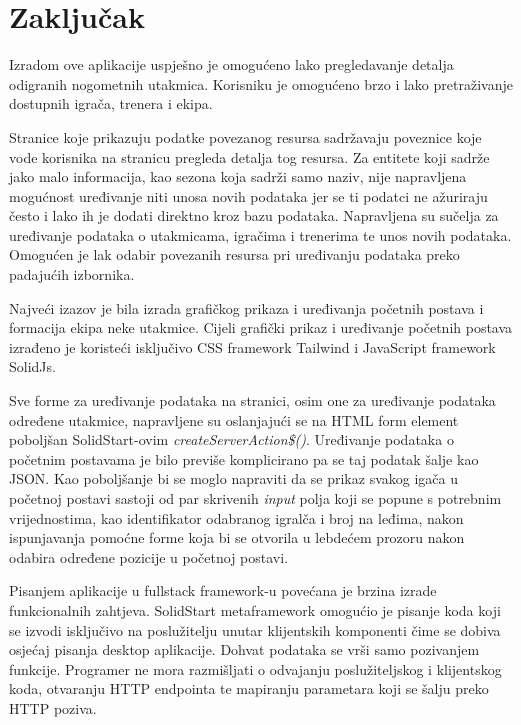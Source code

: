 \documentclass[times, utf8, zavrsni]{fer}
\begin{document}
\chapter{Zaključak}

Izradom ove aplikacije uspješno je omogućeno lako pregledavanje detalja odigranih nogometnih utakmica.
Korisniku je omogućeno brzo i lako pretraživanje dostupnih igrača, trenera i ekipa.

Stranice koje prikazuju podatke povezanog resursa sadržavaju poveznice koje vode korisnika na stranicu pregleda detalja tog resursa.
Za entitete koji sadrže jako malo informacija, kao sezona koja sadrži samo naziv, nije napravljena mogućnost uređivanje niti unosa novih podataka jer se ti podatci ne ažuriraju često i lako ih je dodati direktno kroz bazu podataka.
Napravljena su sučelja za uređivanje podataka o utakmicama, igračima i trenerima te unos novih podataka.
Omogućen je lak odabir povezanih resursa pri uređivanju podataka preko padajućih izbornika.

Najveći izazov je bila izrada grafičkog prikaza i uređivanja početnih postava i formacija ekipa neke utakmice.
Cijeli grafički prikaz i uređivanje početnih postava izrađeno je koristeći isključivo CSS framework Tailwind i JavaScript framework SolidJs.

Sve forme za uređivanje podataka na stranici, osim one za uređivanje podataka određene utakmice, napravljene su oslanjajući se na HTML form element poboljšan SolidStart-ovim \emph{createServerAction\$()}.
Uređivanje podataka o početnim postavama je bilo previše komplicirano pa se taj podatak šalje kao JSON.
Kao poboljšanje bi se moglo napraviti da se prikaz svakog igača u početnoj postavi sastoji od par skrivenih \emph{input} polja koji se popune s potrebnim vrijednostima, kao identifikator odabranog igralča i broj na leđima,
nakon ispunjavanja pomoćne forme koja bi se otvorila u lebdećem prozoru nakon odabira određene pozicije u početnoj postavi.

Pisanjem aplikacije u fullstack framework-u povećana je brzina izrade funkcionalnih zahtjeva.
SolidStart metaframework omogućio je pisanje koda koji se izvodi isključivo na poslužitelju unutar klijentskih komponenti čime se dobiva osjećaj pisanja desktop aplikacije.
Dohvat podataka se vrši samo pozivanjem funkcije. Programer ne mora razmišljati o odvajanju poslužiteljskog i klijentskog koda, otvaranju HTTP endpointa te mapiranju parametara koji se šalju preko HTTP poziva.



\end{document}
